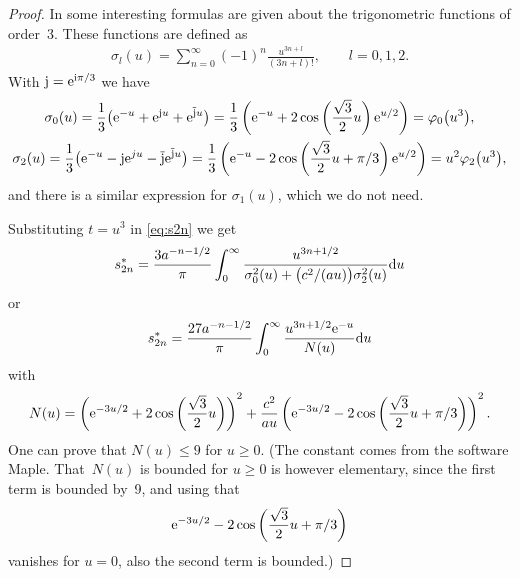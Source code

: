 \documentclass[pdftex]{sigma}
\numberwithin{equation}{section}
\begin{document}
\begin{proof}In \cite{G:L:V} some interesting formulas are given about the trigonometric functions of order~3. These functions are defined as
\begin{gather*}
\sigma_l(u)=\sum_{n=0}^\infty (-1)^n\frac{u^{3n+l}}{(3n+l)!},\qquad l=0,1,2.
\end{gather*}
With ${\rm j}={\rm e}^{{\rm i}\pi/3}$ we have
\begin{gather*}
\sigma_0(u) = \frac13\big({\rm e}^{-u}+{\rm e}^{{\rm j}u}+{\rm e}^{\overline{{\rm j}}u}\big)=\frac13\left({\rm e}^{-u}+2\cos\left(\frac{\sqrt{3}}{2}u\right){\rm e}^{u/2}\right)=\varphi_0\big(u^3\big),\\
\sigma_2(u) = \frac13\big({\rm e}^{-u} -{\rm j} {\rm e}^{ju}- \overline{{\rm j}}{\rm e}^{\overline{{\rm j}}u}\big)=\frac13\left({\rm e}^{-u}-2\cos\left(\frac{\sqrt{3}}{2}u+\pi/3\right){\rm e}^{u/2}\right) = u^2\varphi_2\big(u^3\big),
\end{gather*}
and there is a similar expression for $\sigma_1(u)$, which we do not need.

Substituting $t=u^3$ in \eqref{eq:s2n} we get
\begin{gather*}
s_{2n}^*=\frac{3a^{-n-1/2}}{\pi}\int_0^\infty\frac{u^{3n+1/2}}{\sigma_0^2(u)+\big(c^2/(au)\big)\sigma_2^2(u)}{\rm d}u
\end{gather*}
or
\begin{gather*}
s_{2n}^*=\frac{27a^{-n-1/2}}{\pi}\int_0^\infty\frac{u^{3n+1/2}{\rm e}^{-u}}{N(u)}{\rm d}u
\end{gather*}
with
\begin{gather*}
N(u)=\left({\rm e}^{-3u/2}+2\cos\left(\frac{\sqrt{3}}{2}u\right)\right)^2+\frac{c^2}{au}
\left({\rm e}^{-3u/2}-2\cos\left(\frac{\sqrt{3}}{2}u+\pi/3\right)\right)^2.
\end{gather*}
One can prove that $N(u)\le 9$ for $u\ge 0$. (The constant comes from the software Maple. That~$N(u)$ is bounded for $u\ge 0$ is however elementary, since the first term is bounded by~9, and using that
\begin{gather*}
{\rm e}^{-3u/2}-2\cos\left(\frac{\sqrt{3}}{2}u+\pi/3\right)
\end{gather*}
vanishes for $u=0$, also the second term is bounded.)


\end{proof}
\end{document}

